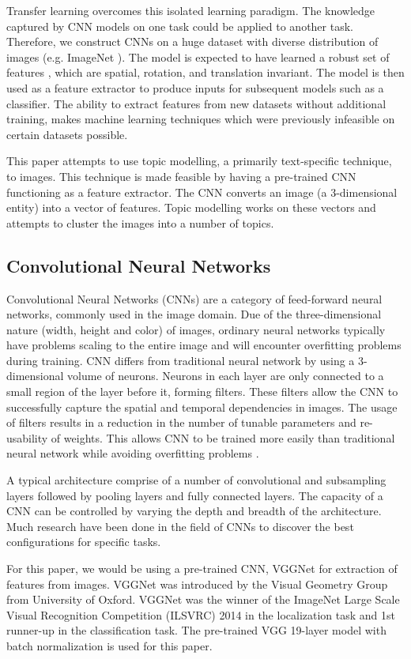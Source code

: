 \documentclass{article}
\begin{document}
Transfer learning overcomes this isolated learning paradigm. The knowledge captured by CNN models on one task could be applied to another task. Therefore, we construct CNNs on a huge dataset with diverse distribution of images (e.g. ImageNet \cite{imagenet}). The model is expected to have learned a robust set of features \cite{vgg}, which are spatial, rotation, and translation invariant. The model is then used as a feature extractor to produce inputs for subsequent models such as a classifier. The ability to extract features from new datasets without additional training, makes machine learning techniques which were previously infeasible on certain datasets possible. 

This paper attempts to use topic modelling, a primarily text-specific technique, to images. This technique is made feasible by having a pre-trained CNN functioning as a feature extractor. The CNN converts an image (a 3-dimensional entity) into a vector of features. Topic modelling works on these vectors and attempts to cluster the images into a number of topics.

\subsection{Convolutional Neural Networks}
Convolutional Neural Networks (CNNs) are a category of feed-forward neural networks, commonly used in the image domain. Due of the three-dimensional nature (width, height and color) of images, ordinary neural networks typically have problems scaling to the entire image and will encounter overfitting problems during training. CNN differs from traditional neural network by using a 3-dimensional volume of neurons. Neurons in each layer are only connected to a small region of the layer before it, forming filters. These filters allow the CNN to successfully capture the spatial and temporal dependencies in images. The usage of filters results in a reduction in the number of tunable parameters and re-usability of weights. This allows CNN to be trained more easily than traditional neural network while avoiding overfitting problems \cite{cnn1}.

A typical architecture comprise of a number of convolutional and subsampling layers followed by pooling layers and fully connected layers. The capacity of a CNN can be controlled by varying the depth and breadth of the architecture. Much research have been done in the field of CNNs to discover the best configurations for specific tasks. 

For this paper, we would be using a pre-trained CNN, VGGNet \cite{vgg} for extraction of features from images. VGGNet was introduced by the Visual Geometry Group from University of Oxford. VGGNet was the winner of the ImageNet Large Scale Visual Recognition Competition (ILSVRC) 2014 in the localization task and 1st runner-up in the classification task. The pre-trained VGG 19-layer model with batch normalization is used for this paper. 
\end{document}
